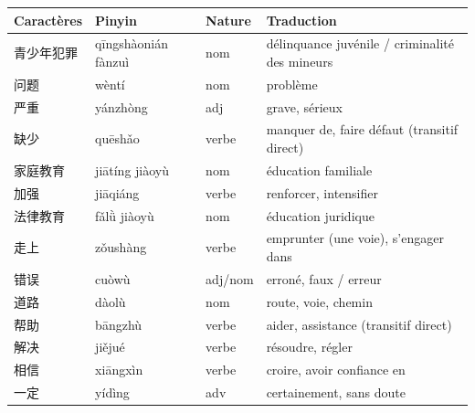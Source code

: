 \documentclass[11pt]{article}
\begin{document}
\begin{definition}
\begin{center}
\begin{tabularx}{\linewidth}{|X|X|X|X|}
\hline
\rowcolor{popblueL} \textbf{Caractères} & \textbf{Pinyin} & \textbf{Nature} & \textbf{Traduction} \\
\hline
青少年犯罪 & qīngshàonián fànzuì & nom & délinquance juvénile / criminalité des mineurs \\
\hline
问题 & wèntí & nom & problème \\
\hline
严重 & yánzhòng & adj & grave, sérieux \\
\hline
缺少 & quēshǎo & verbe & manquer de, faire défaut (transitif direct) \\
\hline
家庭教育 & jiātíng jiàoyù & nom & éducation familiale \\
\hline
加强 & jiāqiáng & verbe & renforcer, intensifier \\
\hline
法律教育 & fǎlǜ jiàoyù & nom & éducation juridique \\
\hline
走上 & zǒushàng & verbe & emprunter (une voie), s'engager dans \\
\hline
错误 & cuòwù & adj/nom & erroné, faux / erreur \\
\hline
道路 & dàolù & nom & route, voie, chemin \\
\hline
帮助 & bāngzhù & verbe & aider, assistance (transitif direct) \\
\hline
解决 & jiějué & verbe & résoudre, régler \\
\hline
相信 & xiāngxìn & verbe & croire, avoir confiance en \\
\hline
一定 & yídìng & adv & certainement, sans doute \\
\hline
\end{tabularx}
\end{center}
\end{definition}
\end{document}
